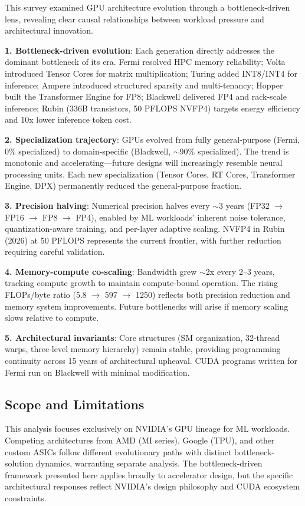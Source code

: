 \documentclass{article}
\begin{document}
This survey examined GPU architecture evolution through a bottleneck-driven lens, revealing clear causal relationships between workload pressure and architectural innovation.

\textbf{1. Bottleneck-driven evolution}: Each generation directly addresses the dominant bottleneck of its era. Fermi resolved HPC memory reliability; Volta introduced Tensor Cores for matrix multiplication; Turing added INT8/INT4 for inference; Ampere introduced structured sparsity and multi-tenancy; Hopper built the Transformer Engine for FP8; Blackwell delivered FP4 and rack-scale inference; Rubin (336B transistors, 50 PFLOPS NVFP4) targets energy efficiency and 10x lower inference token cost.

\textbf{2. Specialization trajectory}: GPUs evolved from fully general-purpose (Fermi, 0\% specialized) to domain-specific (Blackwell, $\sim$90\% specialized). The trend is monotonic and accelerating—future designs will increasingly resemble neural processing units. Each new specialization (Tensor Cores, RT Cores, Transformer Engine, DPX) permanently reduced the general-purpose fraction.

\textbf{3. Precision halving}: Numerical precision halves every $\sim$3 years (FP32 $\to$ FP16 $\to$ FP8 $\to$ FP4), enabled by ML workloads' inherent noise tolerance, quantization-aware training, and per-layer adaptive scaling. NVFP4 in Rubin (2026) at 50 PFLOPS represents the current frontier, with further reduction requiring careful validation.

\textbf{4. Memory-compute co-scaling}: Bandwidth grew $\sim$2x every 2--3 years, tracking compute growth to maintain compute-bound operation. The rising FLOPs/byte ratio (5.8 $\to$ 597 $\to$ 1250) reflects both precision reduction and memory system improvements. Future bottlenecks will arise if memory scaling slows relative to compute.

\textbf{5. Architectural invariants}: Core structures (SM organization, 32-thread warps, three-level memory hierarchy) remain stable, providing programming continuity across 15 years of architectural upheaval. CUDA programs written for Fermi run on Blackwell with minimal modification.

\subsection{Scope and Limitations}

This analysis focuses exclusively on NVIDIA's GPU lineage for ML workloads. Competing architectures from AMD (MI series), Google (TPU), and other custom ASICs follow different evolutionary paths with distinct bottleneck-solution dynamics, warranting separate analysis. The bottleneck-driven framework presented here applies broadly to accelerator design, but the specific architectural responses reflect NVIDIA's design philosophy and CUDA ecosystem constraints.
\end{document}
